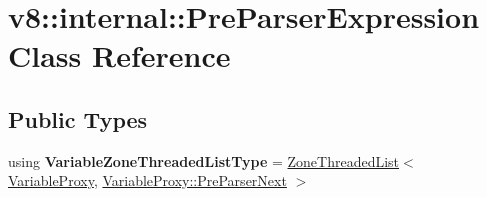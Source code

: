 \hypertarget{classv8_1_1internal_1_1PreParserExpression}{}\section{v8\+:\+:internal\+:\+:Pre\+Parser\+Expression Class Reference}
\label{classv8_1_1internal_1_1PreParserExpression}
\subsection*{Public Types}
\begin{DoxyCompactItemize}
\item 
\mbox{\label{classv8_1_1internal_1_1PreParserExpression_a70c3c2bef9005c8c2aca3d7475bb50cf}} 
using {\bfseries Variable\+Zone\+Threaded\+List\+Type} = \mbox{\hyperlink{classv8_1_1base_1_1ThreadedListBase}{Zone\+Threaded\+List}}$<$ \mbox{\hyperlink{classv8_1_1internal_1_1VariableProxy}{Variable\+Proxy}}, \mbox{\hyperlink{structv8_1_1internal_1_1VariableProxy_1_1PreParserNext}{Variable\+Proxy\+::\+Pre\+Parser\+Next}} $>$
\end{DoxyCompactItemize}
